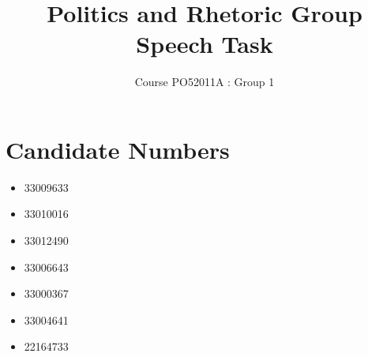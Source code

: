 \documentclass[12pt]{article}
\title{Politics and Rhetoric Group Speech Task}
\author{Course PO52011A : Group 1}
\date{}
\begin{document}


\maketitle

\section{Candidate Numbers}
\begin{itemize}
\item 33009633
\item 33010016
\item 33012490
\item 33006643
\item 33000367
\item 33004641
\item 22164733
\end{itemize}
\end{document}
